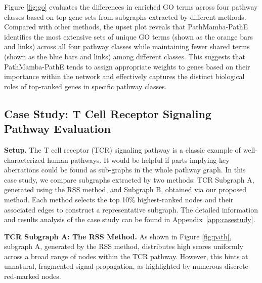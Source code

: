 Figure \ref{fig:go} evaluates the differences in enriched GO terms across four pathway classes based on top gene sets from subgraphs extracted by different methods.
Compared with other methods, the upset plot reveals that PathMamba-PathE identifies the most extensive sets of unique GO terms (shown as the orange bars and links) across all four pathway classes while maintaining fewer shared terms (shown as the blue bars and links) among different classes.
This suggests that PathMamba-PathE tends to assign appropriate weights to genes based on their importance within the network and effectively captures the distinct biological roles of top-ranked genes in specific pathway classes.

\subsection{Case Study: T Cell Receptor Signaling Pathway Evaluation}

\noindent\textbf{Setup.}  
The T cell receptor (TCR) signaling pathway is a classic example of well-characterized human pathways.
It would be helpful if parts implying key aberrations could be found as sub-graphs in the whole pathway graph.
In this case study, we compare subgraphs extracted by two methods: TCR Subgraph A, generated using the RSS method, and Subgraph B, obtained via our proposed method. 
Each method selects the top 10\% highest-ranked nodes and their associated edges to construct a representative subgraph.
The detailed information and results analysis of the case study can be found in Appendix~\ref{app:casestudy}.


\noindent\textbf{TCR Subgraph A: The RSS Method. }  
As shown in Figure \ref{fig:path}, subgraph A, generated by the RSS method, distributes high scores uniformly across a broad range of nodes within the TCR pathway. 
However, this hints at unnatural, fragmented signal propagation, as highlighted by numerous discrete red-marked nodes. 

